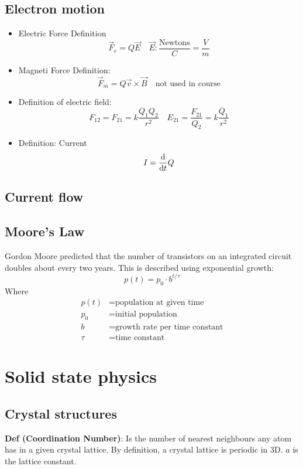 \documentclass[a4paper, fontsize=8pt, landscape, DIV=1]{scrartcl}
\begin{document}
\begin{multicols*}{4}
    \subsection{Electron motion}
    \begin{itemize}
      \item Electric Force Definition
        \[\vec{F}_e = Q\vec{E} \quad \vec{E}:\frac{\text{Newtons}}{C}=\frac{V}{m}\]
      \item Magneti Force Definition:
        \[\vec{F}_m = Q\vec{v}\times\vec{B} \quad \text{not used in course}\]
      \item Definition of electric field:
        \[F_{12}=F_{21}=k\frac{Q_1Q_2}{r^2} \quad E_{21}=\frac{F_21}{Q_2}=k\frac{Q_1}{r^2}\]
      \item Definition: Current
        \[I = \frac{\mathrm{d}}{\mathrm{d}t}Q\]
    \end{itemize}

    \subsection{Current flow}
    
    \subsection{Moore's Law}
    Gordon Moore predicted that the number of transistors on an integrated circuit doubles about every two years. This is described using exponential growth:
    \[p(t) = p_0 \cdot b^{t/\tau}\]
    Where
    \begin{align*}
      p(t) &= \text{population at given time} \\
      p_0 &= \text{initial population} \\
      b &= \text{growth rate per time constant} \\
      \tau &= \text{time constant}
    \end{align*}

  \section{Solid state physics}
  \subsection{Crystal structures}
  \textbf{Def (Coordination Number)}: Is the number of nearest neighbours any atom has in a given crystal lattice. By definition, a crystal lattice is periodic in 3D. $a$ is the lattice constant.


\end{multicols*}
\end{document}
